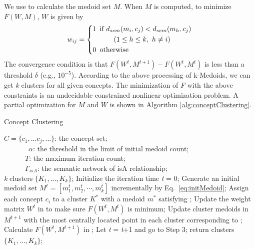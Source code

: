 We use  to calculate the medoid set $M$.
When $M$ is computed, to minimize $F(W, M)$, $W$ is given by
\begin{equation}
\label{eq:weight}
\noindent {w_{ij} = \left\{
\begin{aligned}
1 & \hspace*{5pt} \mbox{if}~ d_{sem}(m_{i},c_{j}) < d_{sem}(m_{h},c_{j})\\
 & \hspace*{25pt} (1 \leq h \leq k,~h \neq i)\\
0 & \hspace*{5pt} \mbox{otherwise}
\end{aligned}
\right.}
\end{equation}
The convergence condition is that $F(W^{t}, M^{t+1})- F(W^{t}, M^{t})$
is less than a threshold $\delta$ (e.g., $10^{-5}$).
According to the above processing of k-Medoids, we can get \emph{k} clusters for all given concepts.
The minimization
of \emph{F} with the above constraints is an undecidable constrained nonlinear
optimization problem. A partial optimization for $M$ and $W$ is
shown in Algorithm \ref{alg:conceptClustering}.

\renewcommand\algorithmicrequire{\textbf{Input:}}
\renewcommand\algorithmicensure {\textbf{Output:}}
\begin{algorithm}[th]
\caption{Concept Clustering}
\label{alg:conceptClustering}
\begin{algorithmic}[1]
\REQUIRE $C=\{c_{1}, ...c_{j},...\}$: the concept set;\\
~~~~~~~$\alpha$: the threshold in the limit of initial medoid count;\\
~~~~~~$T$: the maximum iteration count; \\
~~~~~~$\Gamma_{isA}$: the semantic network of isA relationship;\\
\ENSURE \emph{k} clusters $\{K_{1}, ..., K_{k}\}$; \STATE Initialize the iteration time \emph{t} = 0; \STATE Generate an initial medoid set
$M^{t}=[m_{1}^{t}, m_{2}^{t}, \cdots, m_{k}^{t}]$ incrementally by Eq.~\ref{eq:initMedoid}; \STATE Assign each concept $c_{i}$ to a cluster
$K^{*}$ with a medoid $m^{*}$ satisfying ; \STATE Update the weight matrix $W^{t}$ in  to make sure
$F(W^t, M^t)$ is minimum; \STATE Update cluster medoids in $M^{t+1}$ with the most centrally located point in each cluster corresponding to
; \STATE Calculate $F(W^t, M^{t+1})$ in ;  \STATE Let \emph{t} = \emph{t}+1 and go to Step 3; \ENDIF \STATE return clusters $\{K_{1}, ..., K_{k}\}$;
\end{algorithmic}
\end{algorithm}

